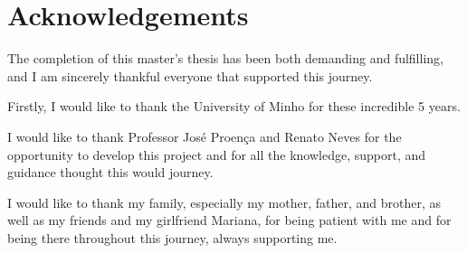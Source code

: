 \chapter*{Acknowledgements}
\setlength{\parskip}{1em}

The completion of this master’s thesis has been both demanding and fulfilling, and I am sincerely thankful everyone that supported this journey. 

Firstly, I would like to thank the University of Minho for these incredible 5 years. 

I would like to thank Professor José Proença and Renato Neves for the opportunity to develop this project and for all the knowledge, support, and guidance thought this would journey. 

I would like to thank my family, especially my mother, father, and brother, as well as my friends and my girlfriend Mariana, for being patient with me and for being there throughout this journey, always supporting me.



\setlength{\parskip}{0em}